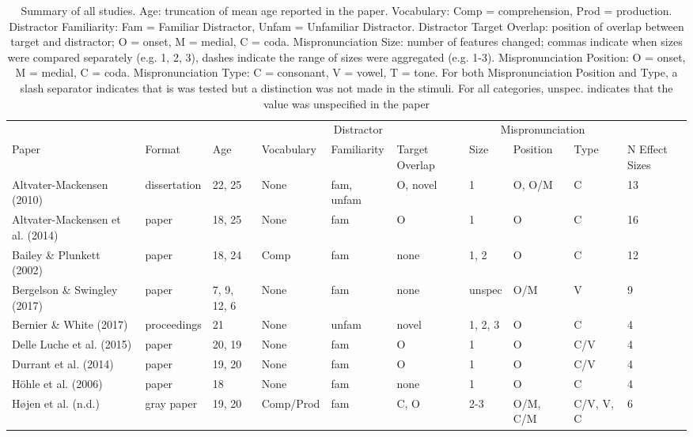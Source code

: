 \documentclass[man]{apa6}
\makeatletter
\newenvironment{lltable}{\begin{landscape}\begin{center}\begin{ThreePartTable}}{\end{ThreePartTable}\end{center}\end{landscape}}
\newcommand\LastLTentrywidth{1em}
\newlength\longtablewidth
\newcommand{\getlongtablewidth}{\begingroup \ifcsname LT@\roman{LT@tables}\endcsname \global\longtablewidth=0pt \renewcommand{\LT@entry}[2]{\global\advance\longtablewidth by ##2\relax\gdef\LastLTentrywidth{##2}}\@nameuse{LT@\roman{LT@tables}} \fi \endgroup}
\theoremstyle{definition}
\theoremstyle{definition}
\theoremstyle{definition}
\theoremstyle{remark}
\makeatother
\begin{document}
\begin{lltable}


\scriptsize{
\begin{longtable}{llllllllll}\noalign{\getlongtablewidth\global\LTcapwidth=\longtablewidth}
\caption{\label{tab:SummaryTable}Summary of all studies. Age: truncation of mean age reported in the paper. Vocabulary: Comp = comprehension, Prod = production. Distractor Familiarity: Fam = Familiar Distractor, Unfam = Unfamiliar Distractor. Distractor Target Overlap: position of overlap between target and distractor; O = onset, M = medial, C = coda. Mispronunciation Size: number of features changed; commas indicate when sizes were compared separately (e.g. 1, 2, 3), dashes indicate the range of sizes were aggregated (e.g. 1-3). Mispronunciation Position: O = onset, M = medial, C = coda. Mispronunciation Type: C = consonant, V = vowel, T = tone. For both Mispronunciation Position and Type, a slash separator indicates that is was tested but a distinction was not made in the stimuli. For all categories, unspec. indicates that the value was unspecified in the paper}\\
\toprule
 &  &  &  & \multicolumn{1}{c}{Distractor} & & \multicolumn{3}{c}{Mispronunciation}  &\\
\cmidrule(r){5-5} \cmidrule(r){7-9}
Paper & Format & Age & Vocabulary & Familiarity & Target Overlap & Size & Position & Type & N Effect Sizes\\
\midrule
Altvater-Mackensen (2010) & dissertation & 22, 25 & None & fam, unfam & O, novel & 1 & O, O/M & C & 13\\
Altvater-Mackensen et al. (2014) & paper & 18, 25 & None & fam & O & 1 & O & C & 16\\
Bailey \& Plunkett (2002) & paper & 18, 24 & Comp & fam & none & 1, 2 & O & C & 12\\
Bergelson \& Swingley (2017) & paper & 7, 9, 12, 6 & None & fam & none & unspec & O/M & V & 9\\
Bernier \& White (2017) & proceedings & 21 & None & unfam & novel & 1, 2, 3 & O & C & 4\\
Delle Luche et al. (2015) & paper & 20, 19 & None & fam & O & 1 & O & C/V & 4\\
Durrant et al. (2014) & paper & 19, 20 & None & fam & O & 1 & O & C/V & 4\\
Höhle et al. (2006) & paper & 18 & None & fam & none & 1 & O & C & 4\\
Højen et al. (n.d.) & gray paper & 19, 20 & Comp/Prod & fam & C, O & 2-3 & O/M, C/M & C/V, V, C & 6\\

\end{longtable}}
\end{lltable}
\end{document}
